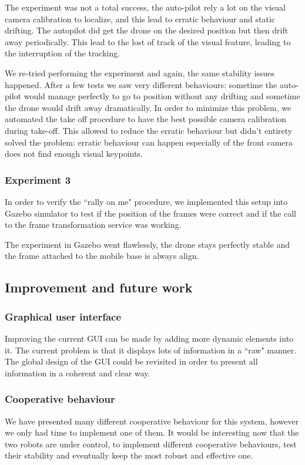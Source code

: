 \documentclass[11pt,a4paper]{article}
\begin{document}
The experiment was not a total success, the auto-pilot rely a lot on the visual camera calibration to 
localize, and this lead to erratic behaviour and static drifting.
The autopilot did get the drone on the desired position but then drift away periodically. This lead to the 
lost of track of the visual feature, leading to the interruption of the tracking.

We re-tried performing the experiment and again, the same stability issues happened. After a few tests we 
saw very different behaviours: sometime the auto-pilot would manage perfectly to go to position without any
drifting and sometime the drone would drift away dramatically. In order to minimize this problem, we 
automated the take off procedure to have the best possible camera calibration during take-off. This 
allowed to reduce the erratic behaviour but didn't entirety solved the problem: erratic behaviour can happen
especially of the front camera does not find enough visual keypoints.

\subsubsection{Experiment 3}
In order to verify the ``rally on me" procedure, we implemented this setup into Gazebo simulator to test if
the position of the frames were correct and if the call to the frame transformation service was working.

The experiment in Gazebo went flawlessly, the drone stays perfectly stable and the frame attached to the 
mobile base is always align.

\subsection{Improvement and future work}
\subsubsection{Graphical user interface}
Improving the current GUI can be made by adding more dynamic elements into it. The current 
problem is
that it displays lots of information in a ``raw" manner. The global design of the GUI could be 
revisited in
order to present all information  in a coherent and clear way.

\subsubsection{Cooperative behaviour}
We have presented many different cooperative behaviour for this system, however we only had 
time to implement one of them. It would be interesting now that the two robots are under 
control, to implement
different cooperative behaviours, test their stability and eventually keep the most robust and 
effective
one.
\end{document}
